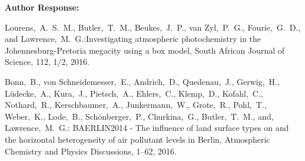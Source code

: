 \documentclass{article}
\begin{document}
\textbf{Author Response:}

\begin{thebibliography}{2}

     Lourens,~A.~S.~M., Butler,~T.~M., Beukes,~J.~P., van Zyl,~P.~G., Fourie,~G.~D., and Lawrence,~M.~G.:Investigating atmospheric photochemistry in the Johennesburg-Pretoria megacity using a box model, South African Journal of Science, 112, 1/2, 2016.

     Bonn,~B., von Schneidemesser,~E., Andrich,~D., Quedenau,~J., Gerwig,~H., L\"udecke,~A., Kura,~J., Pietsch,~A., Ehlers,~C., Klemp,~D., Kofahl,~C., Nothard,~R., Kerschbaumer,~A., Junkermann,~W., Grote,~R., Pohl,~T., Weber,~K., Lode,~B., Sch\"onberger,~P., Churkina,~G., Butler,~T.~M., and, Lawrence,~M.~G.: BAERLIN2014 - The influence of land surface types on and the horizontal heterogeneity of air pollutant levels in Berlin, Atmospheric Chemistry and Physics Discussions, 1--62, 2016.

\end{thebibliography}
\end{document}

